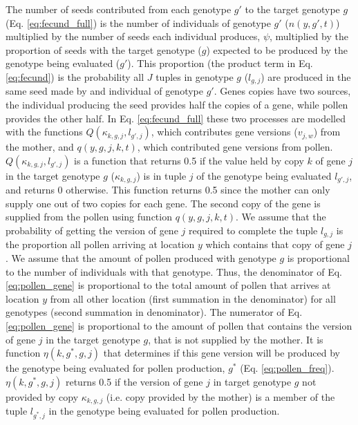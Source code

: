 \documentclass[12pt, a4paper]{article}
\begin{document}
The number of seeds contributed from each genotype $g'$ to the target genotype $g$ (Eq. \ref{eq:fecund_full}) is the number of individuals of genotype $g'$ ($n(y, g', t)$) multiplied by the number of seeds each individual produces, $\psi$, multiplied by the proportion of seeds with the target genotype ($g$) expected to be produced by the genotype being evaluated ($g'$). This proportion (the product term in Eq. \ref{eq:fecund}) is the probability all $J$ tuples in genotype $g$ ($l_{g,j}$) are produced in the same seed made by and individual of genotype $g'$. Genes copies have two sources, the individual producing the seed provides half the copies of a gene, while pollen provides the other half. In Eq. \ref{eq:fecund_full} these two processes are modelled with the functions $Q(\kappa_{k,g,j}, l_{g',j})$, which contributes gene versions ($v_{j,w}$) from the mother, and $q(y, g, j, k, t)$, which contributed gene versions from pollen. $Q(\kappa_{k,g,j}, l_{g',j})$ is a function that returns 0.5 if the value held by copy $k$ of gene $j$ in the target genotype $g$ ($\kappa_{k,g,j}$) is in tuple $j$ of the genotype being evaluated $l_{g',j}$, and returns 0 otherwise. This function returns 0.5 since the mother can only supply one out of two copies for each gene. The second copy of the gene is supplied from the pollen using function $q(y, g, j, k, t)$. We assume that the probability of getting the version of gene $j$ required to complete the tuple $l_{g,j}$ is the proportion all pollen arriving at location $y$ which contains that copy of gene $j$. We assume that the amount of pollen produced with genotype $g$ is proportional to the number of individuals with that genotype. Thus,  the denominator of Eq. \ref{eq:pollen_gene} is proportional to the total amount of pollen that arrives at location $y$ from all other location (first summation in the denominator) for all genotypes (second summation in denominator). The numerator of Eq. \ref{eq:pollen_gene} is proportional to the amount of pollen that contains the version of gene $j$ in the target genotype $g$, that is not supplied by the mother. It is function $\eta(k, g^*, g, j)$ that determines if this gene version will be produced by the genotype being evaluated for pollen production, $g^*$ (Eq. \ref{eq:pollen_freq}). $\eta(k, g^*, g, j)$ returns 0.5 if the version of gene $j$ in target genotype $g$       not provided by copy $\kappa_{k,g,j}$ (i.e. copy provided by the mother) is a member of the tuple $l_{g^*,j}$ in the genotype being evaluated for pollen production.                               
\end{document}

